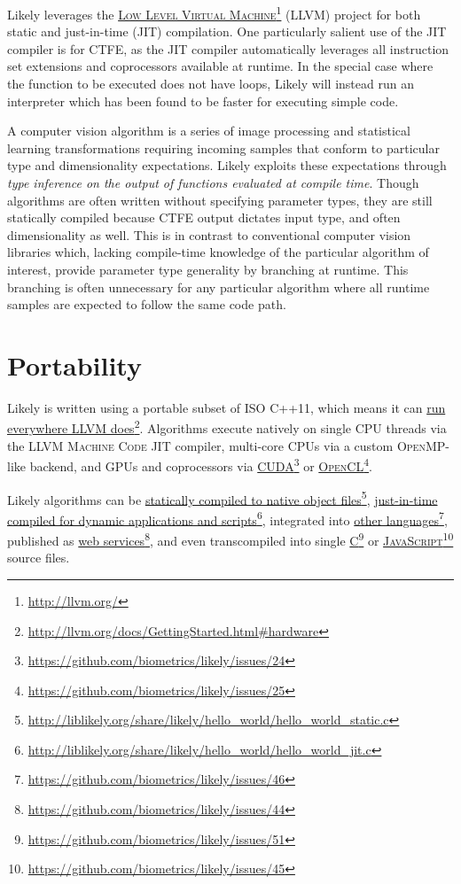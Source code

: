 \documentclass[twoside=false, numbers=noenddot]{scrbook}
\newcommand{\noun}[1]{\textsc{#1}}
\newcommand{\fref}[2]{\href{#1}{#2}\footnote{\href{#1}{#1}}}
\newcommand{\githuburl}{https://github.com/biometrics/likely/}
\begin{document}
Likely leverages the \fref{http://llvm.org/}{\noun{Low Level Virtual Machine}} (LLVM) project for both static and just-in-time (JIT) compilation.
One particularly salient use of the JIT compiler is for CTFE, as the JIT compiler automatically leverages all instruction set extensions and coprocessors available at runtime.
In the special case where the function to be executed does not have loops, Likely will instead run an interpreter which has been found to be faster for executing simple code.

A computer vision algorithm is a series of image processing and statistical learning transformations requiring incoming samples that conform to particular type and dimensionality expectations.
Likely exploits these expectations through \emph{type inference on the output of functions evaluated at compile time}.
Though algorithms are often written without specifying parameter types, they are still statically compiled because CTFE output dictates input type, and often dimensionality as well.
This is in contrast to conventional computer vision libraries which, lacking compile-time knowledge of the particular algorithm of interest, provide parameter type generality by branching at runtime.
This branching is often unnecessary for any particular algorithm where all runtime samples are expected to follow the same code path.

\section{Portability}
Likely is written using a portable subset of \noun{ISO C++11}, which means it can \fref{http://llvm.org/docs/GettingStarted.html\#hardware}{run everywhere LLVM does}.
Algorithms execute natively on single CPU threads via the LLVM \noun{Machine Code JIT} compiler, multi-core CPUs via a custom \noun{OpenMP}-like backend, and GPUs and coprocessors via \fref{\githuburl issues/24}{\noun{CUDA}} or \fref{\githuburl issues/25}{\noun{OpenCL}}.

Likely algorithms can be \fref{http://liblikely.org/share/likely/hello\_world/hello\_world\_static.c}{statically compiled to native object files}, \fref{http://liblikely.org/share/likely/hello\_world/hello\_world\_jit.c}{just-in-time compiled for dynamic applications and scripts}, integrated into \fref{\githuburl issues/46}{other languages}, published as \fref{\githuburl issues/44}{web services}, and even transcompiled into single \fref{\githuburl issues/51}{\noun{C}} or \fref{\githuburl issues/45}{\noun{JavaScript}} source files.
\end{document}
